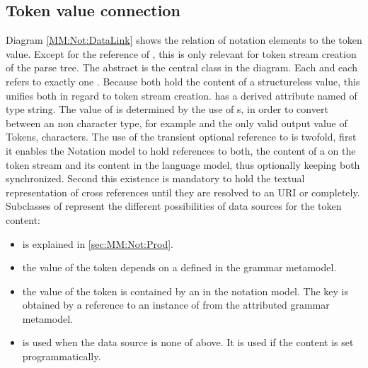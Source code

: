 \subsection{Token value connection}
Diagram \ref{MM:Not:DataLink} shows the relation of notation elements to the token value. Except for the  reference of , this is only relevant for token stream creation of the parse tree. The abstract  is the central class in the diagram. Each  and each  refers to exactly one . Because both hold the content of a structureless value, this unifies both in regard to token stream creation.  has a derived attribute named  of type string. The value of  is determined by the use of s, in order to convert between an non character type, for example  and the only valid output value of Tokens, characters. The use of the transient optional reference to  is twofold, first it enables the Notation model to hold references to both, the content of a  on the token stream and its content in the language model, thus optionally keeping both synchronized. Second this existence is mandatory to hold the textual representation of cross references until they are resolved to an URI or completely. Subclasses of  represent the different possibilities of data sources for the token content:
\begin{itemize}
	\item {} is explained in \ref{sec:MM:Not:Prod}.
	\item {} the value of the token depends on a   defined in the grammar metamodel.
	\item {} the value of the token is contained by an  in the notation model. The key is obtained by a reference to an instance of  from the  attributed grammar metamodel.
	\item {} is used when the data source is none of above. It is used if the content is set programmatically.
\end{itemize}


